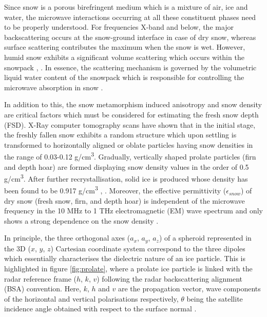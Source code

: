 \documentclass{article}
\begin{document}
Since snow is a porous birefringent medium which is a mixture of air, ice and water, the microwave interactions occurring at all these constituent phases need to be properly understood. For frequencies X-band and below, the major backscattering occurs at the snow-ground interface in case of dry snow, whereas surface scattering contributes the maximum when the snow is wet. However, humid snow exhibits a significant volume scattering which occurs within the snowpack \cite{Thakur2012}, \cite{Leinss2014}. In essence, the scattering mechanism is governed by the volumetric liquid water content of the snowpack which is responsible for controlling the microwave absorption in snow \cite{Leinss2014}.

In addition to this, the snow metamorphism induced anisotropy and snow density are critical factors which must be considered for estimating the fresh snow depth (FSD). X-Ray computer tomography scans have shown that in the initial stage, the freshly fallen snow exhibits a random structure which upon settling is transformed to horizontally aligned or oblate particles having snow densities in the range of 0.03-0.12 g/cm\textsuperscript{3}. Gradually, vertically shaped prolate particles (firn and depth hoar) are formed displaying snow density values in the order of 0.5 g/cm\textsuperscript{3}. After further recrystallisation, solid ice is produced whose density has been found to be 0.917 g/cm\textsuperscript{3} \cite{Leinss2014}, \cite{Riche2013}. Moreover, the effective permittivity ($\epsilon_{snow}$) of dry snow (fresh snow, firn, and depth hoar) is independent of the microwave frequency in the 10 MHz to 1 THz electromagnetic (EM) wave spectrum and only shows a strong dependence on the snow density \cite{Leinss2015}.

In principle, the three orthogonal axes ($a_x$, $a_y$, $a_z$) of a spheroid represented in the 3D ($x$, $y$, $z$) Cartesian coordinate system correspond to the three dipoles which essentially characterises the dielectric nature of an ice particle. This is highlighted in figure \ref{fig:prolate}, where a prolate ice particle is linked with the radar reference frame ($h$, $k$, $v$) following the radar backscattering alignment (BSA) convention. Here, $k$, $h$ and $v$ are the propagation vector, wave components of the horizontal and vertical polarisations respectively, $\theta$ being the satellite incidence angle obtained with respect to the surface normal \cite{Leinss2014}.
\end{document}
